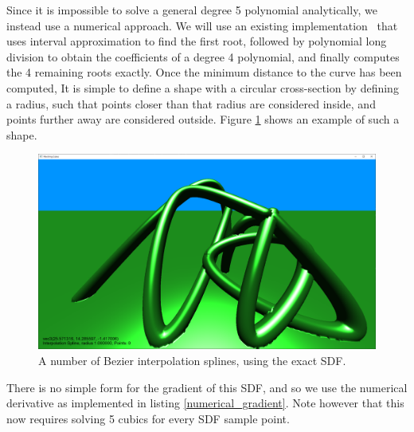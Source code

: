 \documentclass[11pt]{article}
\begin{document}
Since it is impossible to solve a general degree 5 polynomial analytically, we instead use a numerical approach. We will use an existing implementation~\cite{kraus_2021} that uses interval approximation to find the first root, followed by polynomial long division to obtain the coefficients of a degree 4 polynomial, and finally computes the 4 remaining roots exactly. Once the minimum distance to the curve has been computed, It is simple to define a shape with a circular cross-section by defining a radius, such that points closer than that radius are considered inside, and points further away are considered outside. Figure \ref{fig:exact_bezier} shows an example of such a shape.
\begin{figure}[H]
  \includegraphics[width=\textwidth]{exact_bezier}
  \caption{A number of Bezier interpolation splines, using the exact SDF.}
  \label{fig:exact_bezier}
\end{figure}

There is no simple form for the gradient of this SDF, and so we use the numerical derivative as implemented in listing \ref{numerical_gradient}. Note however that this now requires solving 5 cubics for every SDF sample point.
\end{document}
